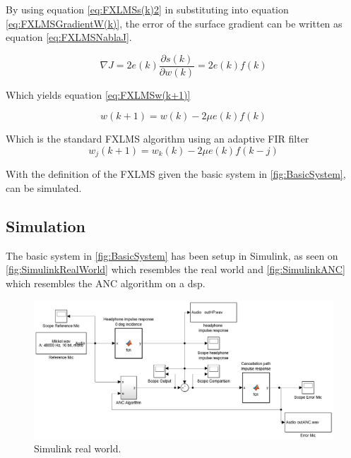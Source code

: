 By using equation \ref{eq:FXLMSs(k)2} in substituting into equation \ref{eq:FXLMSGradientW(k)}, the error of the surface gradient can be written as equation \ref{eq:FXLMSNablaJ}.

\begin{equation}\label{eq:FXLMSNablaJ}
\nabla J = 2e(k)\frac{\partial s(k)}{\partial w(k)} = 2e(k)f(k)
\end{equation}

Which yields equation \ref{eq:FXLMSw(k+1)}

\begin{equation}\label{eq:FXLMSw(k+1)}
w(k+1) = w(k) - 2\mu e(k)f(k)
\end{equation}

Which is the standard FXLMS algorithm using an adaptive FIR filter
\begin{equation}\label{eq:FXLMSw_j(k+1)}
w_j(k+1) = w_k(k) - 2\mu e(k)f(k-j)
\end{equation}

With the definition of the FXLMS given the basic system in \autoref{fig:BasicSystem}, can be simulated.







\subsection{Simulation} 
The basic system in \autoref{fig:BasicSystem} has been setup in Simulink, as seen on \autoref{fig:SimulinkRealWorld} which resembles the real world and \autoref{fig:SimulinkANC} which resembles the ANC algorithm on a dsp. 

\begin{figure}[H]
	\centering
	\includegraphics[width=1\textwidth]{figures/BasicSystem/SimulinkRealWorld}
	\caption{Simulink real world.}
	\label{fig:SimulinkRealWorld}
\end{figure}    


